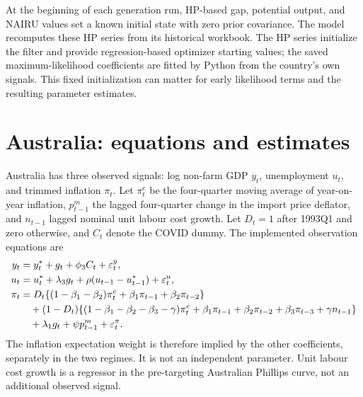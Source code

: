 \documentclass[11pt,a4paper]{article}
\newcommand{\NAIRU}{u^{*}}
\newcommand{\gap}{g}
\newcommand{\eps}{\varepsilon}
\begin{document}
At the beginning of each generation run, HP-based gap, potential output, and
NAIRU values set a known initial state with zero prior covariance. The model recomputes these HP series from its historical workbook. The HP series initialize the
filter and provide regression-based optimizer starting values; the saved
maximum-likelihood coefficients are fitted by Python from the country's own
signals. This fixed initialization can matter for early likelihood terms and
the resulting parameter estimates.

\section{Australia: equations and estimates}
Australia has three observed signals: log non-farm GDP $y_t$, unemployment
$u_t$, and trimmed inflation $\pi_t$. Let $\pi_t^e$ be the four-quarter moving
average of year-on-year inflation, $p_{t-1}^m$ the lagged four-quarter change
in the import price deflator, and $n_{t-1}$ lagged nominal unit labour cost
growth. Let $D_t=1$ after 1993Q1 and zero otherwise, and $C_t$ denote the
COVID dummy. The implemented observation equations are
\begin{align}
 y_t &= y_t^*+\gap_t+\phi_3 C_t+\eps^y_t,\\
 u_t &= \NAIRU_t+\lambda_3\gap_t
       +\rho(u_{t-1}-\NAIRU_{t-1})+\eps^u_t,\\
 \pi_t &= D_t\{(1-\beta_1-\beta_2)\pi_t^e
                  +\beta_1\pi_{t-1}+\beta_2\pi_{t-2}\}\notag\\
 &\quad +(1-D_t)\{(1-\beta_1-\beta_2-\beta_3-\gamma)\pi_t^e
              +\beta_1\pi_{t-1}+\beta_2\pi_{t-2}
              +\beta_3\pi_{t-3}+\gamma n_{t-1}\}\notag\\
 &\quad +\lambda_1\gap_t+\psi p_{t-1}^m+\eps^\pi_t.
\end{align}
The inflation expectation weight is therefore implied by the other
coefficients, separately in the two regimes. It is not an independent
parameter. Unit labour cost growth is a regressor in the pre-targeting
Australian Phillips curve, not an additional observed signal.
\end{document}
